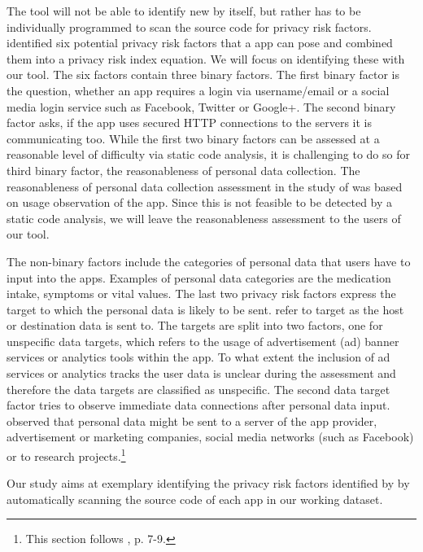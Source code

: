 \documentclass[
	a4paper,
	oneside,
	12pt,
	liststotocnumbered
]{article}
\let\cite\textcite
\begin{document}
The \sca tool will not be able to identify new \prfs by itself, but rather has to be individually programmed to scan the source code for privacy risk factors.
\cite{Bruggemann2016} identified six potential privacy risk factors that a \mH app can pose and combined them into a privacy risk index equation. 
We will focus on identifying these \prfs with our \sca tool.
The six factors contain three binary factors.
The first binary factor is the question, whether an app requires a login via username/email or a social media login service such as Facebook, Twitter or Google+. 
The second binary factor asks, if the app uses secured \acs{HTTP} connections to the servers it is communicating too.
While the first two binary factors can be assessed at a reasonable level of difficulty via static code analysis, it is challenging to do so for third binary factor, the reasonableness of personal data collection. 
The reasonableness of personal data collection assessment in the study of \cite{Bruggemann2016} was based on usage observation of the app. 
Since this is not feasible to be detected by a static code analysis, we will leave the reasonableness assessment to the users of our tool. 

The non-binary factors include the categories of personal data that users have to input into the \mH apps. Examples of personal data categories are the medication intake, symptoms or vital values.
The last two privacy risk factors express the target to which the personal data is likely to be sent. 
\cite{Bruggemann2016} refer to target as the host or destination data is sent to.
The targets are split into two factors, one for unspecific data targets, which refers to the usage of advertisement (ad) banner services or analytics tools within the app. 
To what extent the inclusion of ad services or analytics tracks the user data is unclear during the assessment and therefore the data targets are classified as unspecific.
The second data target factor tries to observe immediate data connections after personal data input. 
\cite{Bruggemann2016} observed that personal data might be sent to a server of the app provider, advertisement or marketing companies, social media networks (such as Facebook) or to research projects.\footnote{This section follows \cite{Bruggemann2016}, p. 7-9.}

Our study aims at exemplary identifying the privacy risk factors identified by \cite{Bruggemann2016} by automatically scanning the source code of each app in our working dataset. 
\end{document}
